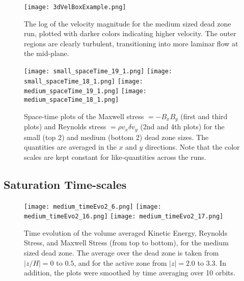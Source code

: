 \begin{figure}[p]
\centering
\texttt{[image: 3dVelBoxExample.png]}
\caption{The log of the velocity magnitude for the medium sized dead zone run, plotted with darker colors indicating higher velocity.  The outer regions are clearly turbulent, transitioning into more laminar flow at the mid-plane.  }
\label{fig3dBox}
\end{figure}

\begin{figure}[p]
\centering
\texttt{[image: small\_spaceTime\_19\_1.png]}
\texttt{[image: small\_spaceTime\_18\_1.png]}
\texttt{[image: medium\_spaceTime\_19\_1.png]}
\texttt{[image: medium\_spaceTime\_18\_1.png]}
\caption{Space-time plots of the Maxwell stress $=-B_x B_y$ (first and third plots) and Reynolds stress $=\rho v_x \delta v_y$ (2nd and 4th plots) for the small (top 2) and medium (bottom 2) dead zone sizes.  The quantities are averaged in the $x$ and $y$ directions.  Note that the color scales are kept constant for like-quantities across the runs. }
\label{figSTstress}
\end{figure}


\subsection{Saturation Time-scales}
\begin{figure}[p]
\centering
\texttt{[image: medium\_timeEvo2\_6.png]}
\texttt{[image: medium\_timeEvo2\_16.png]}
\texttt{[image: medium\_timeEvo2\_17.png]}

\caption{Time evolution of the volume averaged Kinetic Energy, Reynolds Stress, and Maxwell Stress (from top to bottom), for the medium sized dead zone.  The average over the dead zone is taken from $|z/H|=0$ to $0.5$, and for the active zone from $|z|=2.0$ to $3.3$.  In addition, the plots were smoothed by time averaging over 10 orbits. }
\label{figTimeEvo}
\end{figure}


